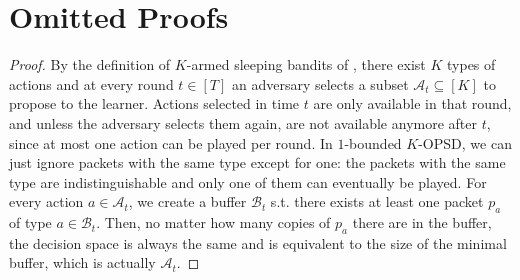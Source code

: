 \section{Omitted Proofs}
\label{apx:proofs}
\reductionMABS*
\begin{proof}
    By the definition of $K$-armed sleeping bandits of \cite{kleinberg2010regret}, there exist $K$ types of actions and at every round $t \in [T]$ an adversary selects a subset $\mathcal{A}_t \subseteq [K]$ to propose to the learner. Actions selected in time $t$ are only available in that round, and unless the adversary selects them again, are not available anymore after $t$, since at most one action can be played per round. In $1$-bounded $K$-OPSD, we can just ignore packets with the same type except for one: the packets with the same type are indistinguishable and only one of them can eventually be played. For every action $a \in \mathcal{A}_t$, we create a buffer $\mathcal{B}_t$ s.t. there exists at least one packet $p_a$ of type $a \in \mathcal{B}_t$. Then, no matter how many copies of $p_a$ there are in the buffer, the decision space is always the same and is equivalent to the size of the minimal buffer, which is actually $\mathcal{A}_t$.
\end{proof}
